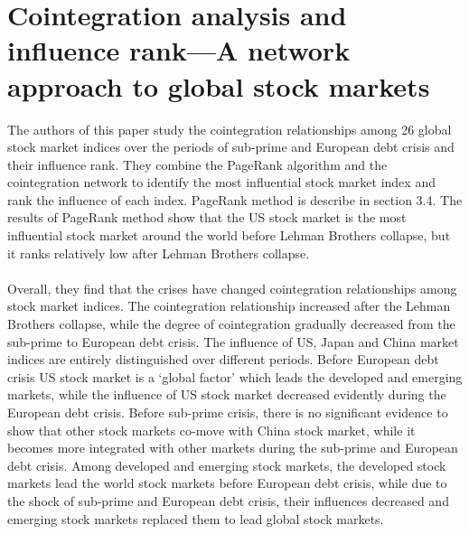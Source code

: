 \documentclass{article}
\begin{document}
\section{Cointegration analysis and influence rank—A network approach to global stock markets}
The authors of this paper study the cointegration relationships among 26 global stock market indices over the periods of sub-prime and European debt crisis and their influence rank. They combine the PageRank algorithm and the cointegration network to identify the most influential stock market index and rank the influence of each index. PageRank method is describe in section 3.4. The results of PageRank method show that the US stock market is the most influential stock market around the world before Lehman Brothers collapse, but it ranks relatively low after Lehman Brothers collapse.\\\\
Overall, they find that the crises have changed cointegration relationships among stock market indices. The cointegration relationship increased after the Lehman Brothers collapse, while the degree of cointegration gradually decreased from the sub-prime to European debt crisis. The influence of US, Japan and China market indices are entirely distinguished over different periods. Before European debt crisis US stock market is a ‘global factor’ which leads the developed and emerging markets, while the influence of US stock market decreased evidently during the European debt crisis. Before sub-prime crisis, there is no significant evidence to show that other stock markets co-move with China stock market, while it becomes more integrated with other markets during the sub-prime and European debt crisis. Among developed and emerging stock markets, the developed stock markets lead the world stock markets before European debt crisis, while due to the shock of sub-prime and European debt crisis, their influences decreased and emerging stock markets replaced them to lead global stock markets.\\\\
\end{document}
